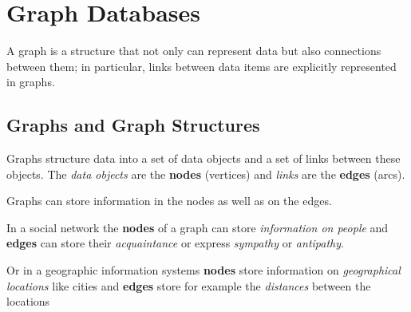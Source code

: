 \chapter{Graph Databases}
A graph is a structure that not only can represent data but also connections between them; in particular, links between data items are explicitly represented in graphs.

\section{Graphs and Graph Structures}
Graphs structure data into a set of data objects and a set of links between these objects. The \textit{data objects} are the \textbf{nodes} (vertices) and \textit{links} are the \textbf{edges} (arcs).

\begin{tcolorbox}
Graphs can store information in the nodes as well as on the edges.
\end{tcolorbox}

In a social network the \textbf{nodes} of a graph can store \textit{information on people} and \textbf{edges} can store their \textit{acquaintance} or express \textit{sympathy} or \textit{antipathy}.

Or in a geographic information systems \textbf{nodes} store information on \textit{geographical locations} like cities and \textbf{edges} store for example the \textit{distances} between the locations

